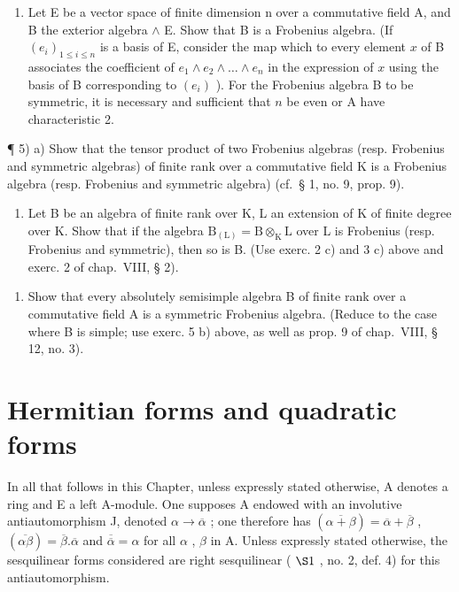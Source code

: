 \begin{enumerate}
\def\labelenumi{\alph{enumi})}
\setcounter{enumi}{1}
\tightlist
\item
  Let E be a vector space of finite dimension n over a commutative field A, and B the exterior algebra \(\wedge\) E. Show that B is a Frobenius algebra. (If \((e_i)_{1 \leqslant i \leqslant n}\) is a basis of E, consider the map which to every element \(x\) of B associates the coefficient of \(e_1 \wedge e_2 \wedge \ldots \wedge e_n\) in the expression of \(x\) using the basis of B corresponding to \((e_i)\) ). For the Frobenius algebra B to be symmetric, it is necessary and sufficient that \(n\) be even or A have characteristic 2.
\end{enumerate}

¶ 5) a) Show that the tensor product of two Frobenius algebras (resp. Frobenius and symmetric algebras) of finite rank over a commutative field K is a Frobenius algebra (resp. Frobenius and symmetric algebra) (cf.~§ 1, no. 9, prop. 9).

\begin{enumerate}
\def\labelenumi{\alph{enumi})}
\setcounter{enumi}{1}
\tightlist
\item
  Let B be an algebra of finite rank over K, L an extension of K of finite degree over K. Show that if the algebra \(\mathrm{B}_{(\mathrm{L})} = \mathrm{B} \otimes_{\mathrm{K}} \mathrm{L}\) over L is Frobenius (resp. Frobenius and symmetric), then so is B. (Use exerc. 2 c) and 3 c) above and exerc. 2 of chap.~VIII, § 2).
\end{enumerate}

\begin{enumerate}
\def\labelenumi{\arabic{enumi})}
\setcounter{enumi}{5}
\tightlist
\item
  Show that every absolutely semisimple algebra B of finite rank over a commutative field A is a symmetric Frobenius algebra. (Reduce to the case where B is simple; use exerc. 5 b) above, as well as prop. 9 of chap.~VIII, § 12, no. 3).
\end{enumerate}

\section{Hermitian forms and quadratic forms}

In all that follows in this Chapter, unless expressly stated otherwise, A denotes a ring and E a left A-module. One supposes A endowed with an involutive antiautomorphism J, denoted \(\alpha \to \overline{\alpha}\) ; one therefore has \((\overline{\alpha + \beta}) = \overline{\alpha} + \overline{\beta}\) , \((\overline{\alpha\beta}) = \overline{\beta}.\overline{\alpha}\) and \(\overline{\overline{\alpha}} = \alpha\) for all \(\alpha\) , \(\beta\) in A. Unless expressly stated otherwise, the sesquilinear forms considered are right sesquilinear ( \(\S 1\) , no. 2, def. 4) for this antiautomorphism.

